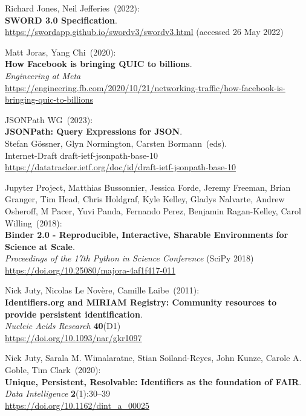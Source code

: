 \begin{thebibliography}{9}
Richard Jones, Neil Jefferies~(2022): \\
\textbf{SWORD 3.0 Specification}. \\
\url{https://swordapp.github.io/swordv3/swordv3.html} (accessed 26 May
2022)

Matt Joras, Yang Chi~(2020): \\
\textbf{How Facebook is bringing QUIC to billions}.\\
\emph{Engineering at Meta}\\
\url{https://engineering.fb.com/2020/10/21/networking-traffic/how-facebook-is-bringing-quic-to-billions}

JSONPath WG~(2023): \\
\textbf{JSONPath: Query Expressions for JSON}.\\
Stefan Gössner, Glyn Normington, Carsten Bormann~(eds).\\
Internet-Draft draft-ietf-jsonpath-base-10\\
\url{https://datatracker.ietf.org/doc/id/draft-ietf-jsonpath-base-10}

Jupyter Project, Matthias Bussonnier, Jessica Forde, Jeremy Freeman, Brian Granger, Tim Head, Chris Holdgraf, Kyle Kelley, Gladys Nalvarte, Andrew Osheroff, M Pacer, Yuvi Panda, Fernando Perez, Benjamin Ragan-Kelley, Carol Willing~(2018): \\
\textbf{Binder 2.0 - Reproducible, Interactive, Sharable Environments for Science at Scale}.\\
\emph{Proceedings of the 17th Python in Science Conference} (SciPy 2018)\\
\url{https://doi.org/10.25080/majora-4af1f417-011}

Nick Juty, Nicolas Le Novère, Camille Laibe~(2011): \\
\textbf{Identifiers.org and {MIRIAM Registry}: Community resources to provide persistent identification}.\\
\emph{Nucleic Acids Research} \textbf{40}(D1) \\
\url{https://doi.org/10.1093/nar/gkr1097}

Nick Juty, Sarala M. Wimalaratne, Stian Soiland-Reyes, John Kunze, Carole A. Goble, Tim Clark~(2020): \\
\textbf{Unique, Persistent, Resolvable: Identifiers as the foundation of FAIR}.
\emph{Data Intelligence} \textbf{2}(1):30–39\\
\url{https://doi.org/10.1162/dint_a_00025}


\end{thebibliography}
